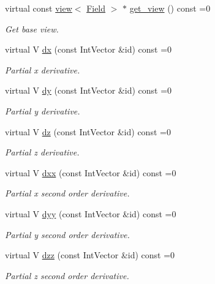 \begin{DoxyCompactItemize}
virtual const \hyperlink{classUintah_1_1PhaseField_1_1detail_1_1view}{view}$<$ \hyperlink{structUintah_1_1PhaseField_1_1ScalarField}{Field} $>$ $\ast$ \hyperlink{classUintah_1_1PhaseField_1_1detail_1_1basic__fd__view_3_01ScalarField_3_01T_01_4_00_01STN_01_4_a006d6f7c6fd81ff2c8d53f59656a23dc}{get\+\_\+view} () const =0
\begin{DoxyCompactList}\small\item\em Get base view. \end{DoxyCompactList}\item 
virtual V \hyperlink{classUintah_1_1PhaseField_1_1detail_1_1basic__fd__view_3_01ScalarField_3_01T_01_4_00_01STN_01_4_a55198fb0007fd73e5a20bd4746f59c6f}{dx} (const Int\+Vector \&id) const =0
\begin{DoxyCompactList}\small\item\em Partial x derivative. \end{DoxyCompactList}\item 
virtual V \hyperlink{classUintah_1_1PhaseField_1_1detail_1_1basic__fd__view_3_01ScalarField_3_01T_01_4_00_01STN_01_4_ac30b34cfd91c6f4df4eec1a0a224c405}{dy} (const Int\+Vector \&id) const =0
\begin{DoxyCompactList}\small\item\em Partial y derivative. \end{DoxyCompactList}\item 
virtual V \hyperlink{classUintah_1_1PhaseField_1_1detail_1_1basic__fd__view_3_01ScalarField_3_01T_01_4_00_01STN_01_4_a0a37a79b114139b6b8cb2d238897d0b0}{dz} (const Int\+Vector \&id) const =0
\begin{DoxyCompactList}\small\item\em Partial z derivative. \end{DoxyCompactList}\item 
virtual V \hyperlink{classUintah_1_1PhaseField_1_1detail_1_1basic__fd__view_3_01ScalarField_3_01T_01_4_00_01STN_01_4_a3ea4026cb6251facdd6548bb4ce76408}{dxx} (const Int\+Vector \&id) const =0
\begin{DoxyCompactList}\small\item\em Partial x second order derivative. \end{DoxyCompactList}\item 
virtual V \hyperlink{classUintah_1_1PhaseField_1_1detail_1_1basic__fd__view_3_01ScalarField_3_01T_01_4_00_01STN_01_4_a387a991c42fe021f192dee7e0db5908a}{dyy} (const Int\+Vector \&id) const =0
\begin{DoxyCompactList}\small\item\em Partial y second order derivative. \end{DoxyCompactList}\item 
virtual V \hyperlink{classUintah_1_1PhaseField_1_1detail_1_1basic__fd__view_3_01ScalarField_3_01T_01_4_00_01STN_01_4_a6a9141dd1b9b547eba1bd7ff0440b6bf}{dzz} (const Int\+Vector \&id) const =0
\begin{DoxyCompactList}\small\item\em Partial z second order derivative. \end{DoxyCompactList}\end{DoxyCompactItemize}

